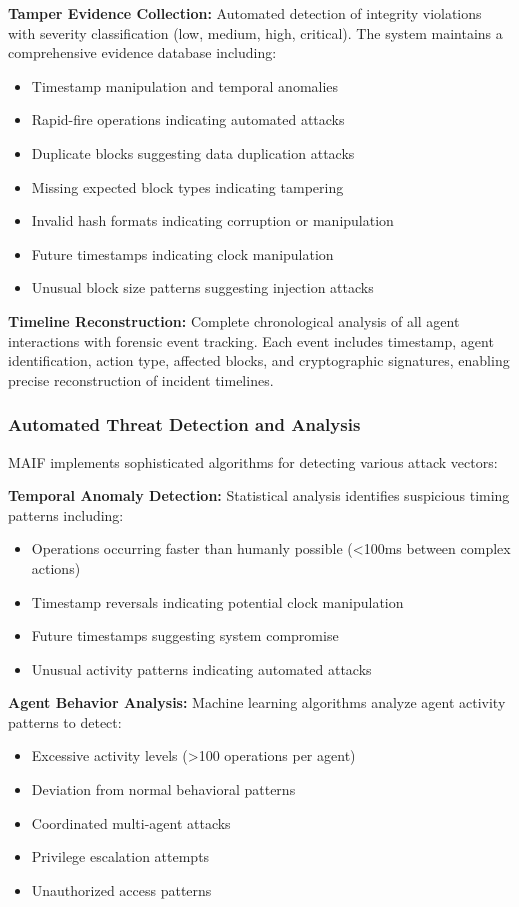 \documentclass[conference]{IEEEtran}
\begin{document}
\textbf{Tamper Evidence Collection:} Automated detection of integrity violations with severity classification (low, medium, high, critical). The system maintains a comprehensive evidence database including:
\begin{itemize}[leftmargin=*]
\item Timestamp manipulation and temporal anomalies
\item Rapid-fire operations indicating automated attacks
\item Duplicate blocks suggesting data duplication attacks
\item Missing expected block types indicating tampering
\item Invalid hash formats indicating corruption or manipulation
\item Future timestamps indicating clock manipulation
\item Unusual block size patterns suggesting injection attacks
\end{itemize}

\textbf{Timeline Reconstruction:} Complete chronological analysis of all agent interactions with forensic event tracking. Each event includes timestamp, agent identification, action type, affected blocks, and cryptographic signatures, enabling precise reconstruction of incident timelines.

\subsubsection{Automated Threat Detection and Analysis}

MAIF implements sophisticated algorithms for detecting various attack vectors:

\textbf{Temporal Anomaly Detection:} Statistical analysis identifies suspicious timing patterns including:
\begin{itemize}[leftmargin=*]
\item Operations occurring faster than humanly possible (<100ms between complex actions)
\item Timestamp reversals indicating potential clock manipulation
\item Future timestamps suggesting system compromise
\item Unusual activity patterns indicating automated attacks
\end{itemize}

\textbf{Agent Behavior Analysis:} Machine learning algorithms analyze agent activity patterns to detect:
\begin{itemize}[leftmargin=*]
\item Excessive activity levels (>100 operations per agent)
\item Deviation from normal behavioral patterns
\item Coordinated multi-agent attacks
\item Privilege escalation attempts
\item Unauthorized access patterns
\end{itemize}
\end{document}
